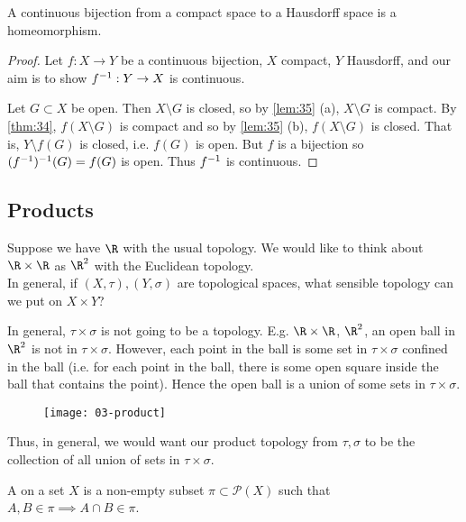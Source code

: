 \begin{theorem} \label{thm:36}
A continuous bijection from a compact space to a Hausdorff space is a homeomorphism.
\end{theorem}   

\begin{proof}
    Let $f: X \to Y$ be a continuous bijection, $X$ compact, $Y$ Hausdorff, and our aim is to show $f^{-1} : Y \to X$ is continuous.

    Let $G\subset X$ be open. Then $X \setminus G$ is closed, so by \cref{lem:35} (a), $X \setminus G$ is compact.
    By \cref{thm:34}, $f(X \setminus G)$ is compact and so by \cref{lem:35} (b), $f(X \setminus G)$ is closed.
    That is, $Y \setminus f(G)$ is closed, i.e. $f(G)$ is open.
    But $f$ is a bijection so $(f^{-1})^{-1} (G) = f(G)$ is open. Thus $f^{-1}$ is continuous.
\end{proof}

\subsection{Products}
Suppose we have $\R$ with the usual topology. We would like to think about $\R \times \R$ as $\R^2$ with the Euclidean topology. \\
In general, if $(X, \tau), (Y, \sigma)$ are topological spaces, what sensible topology can we put on $X \times Y$? 

In general, $\tau \times \sigma$ is not going to be a topology. E.g. $\R\times \R$, $\R^2$, an open ball in $\R^2$ is not in $\tau\times \sigma$. However, each point in the ball is some set in $\tau\times \sigma$ confined in the ball (i.e. for each point in the ball, there is some open square inside the ball that contains the point). Hence the open ball is a union of some sets in $\tau \times \sigma$.

\begin{figure}[h] 
    \centering 
    \texttt{[image: 03-product]} 
\end{figure}

Thus, in general, we would want our product topology from $\tau,\sigma$ to be the collection of all union of sets in $\tau \times\sigma$.

\begin{definition}[$\pi$-system]
A  on a set $X$ is a non-empty subset $\pi\subset \mathcal{P}(X)$ such that $A,B\in \pi \implies A\cap B\in \pi$.
\end{definition}

